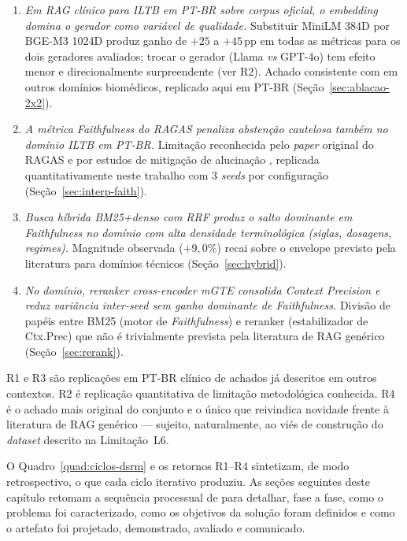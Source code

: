 \documentclass[
  12pt,
  oneside,
  a4paper,
  english,
  brazil
]{abntex2}
\begin{document}
\begin{enumerate}[label=\textbf{R\arabic*}, leftmargin=*]
  \item \emph{Em RAG clínico para ILTB em PT-BR sobre corpus oficial, o
        \emph{embedding} domina o gerador como variável de qualidade.}
        Substituir MiniLM 384D por BGE-M3 1024D produz ganho de $+25$
        a $+45$\,pp em todas as métricas para os dois geradores
        avaliados; trocar o gerador (Llama \emph{vs} GPT-4o) tem
        efeito menor e direcionalmente surpreendente (ver R2). Achado
        consistente com \citeauthor{ocaf2024} \cite{ocaf2024} em outros
        domínios biomédicos, replicado aqui em PT-BR
        (Seção~\ref{sec:ablacao-2x2}).
  \item \emph{A métrica \emph{Faithfulness} do RAGAS penaliza
        abstenção cautelosa também no domínio ILTB em PT-BR.}
        Limitação reconhecida pelo \emph{paper} original do RAGAS
        \cite{es2024} e por estudos de mitigação de alucinação
        \cite{huang2023halucination, zakka2024almanac, ocaf2024},
        replicada quantitativamente neste trabalho com 3 \emph{seeds}
        por configuração (Seção~\ref{sec:interp-faith}).
  \item \emph{Busca híbrida BM25+denso com RRF produz o salto dominante
        em \emph{Faithfulness} no domínio com alta densidade
        terminológica (siglas, dosagens, regimes).} Magnitude observada
        ($+9{,}0\%$) recai sobre o envelope previsto pela literatura
        \cite{wang2024bestpractices} para domínios técnicos
        (Seção~\ref{sec:hybrid}).
  \item \emph{No domínio, \emph{reranker} \emph{cross-encoder} mGTE
        consolida \emph{Context Precision} e reduz variância
        inter-\emph{seed} sem ganho dominante de \emph{Faithfulness}.}
        Divisão de papéis entre BM25 (motor de \emph{Faithfulness}) e
        reranker (estabilizador de Ctx.Prec) que não é trivialmente
        prevista pela literatura de RAG genérico
        (Seção~\ref{sec:rerank}).
\end{enumerate}

R1 e R3 são replicações em PT-BR clínico de achados já descritos em
outros contextos. R2 é replicação quantitativa de limitação
metodológica conhecida. R4 é o achado mais original do conjunto e o
único que reivindica novidade frente à literatura de RAG genérico ---
sujeito, naturalmente, ao viés de construção do \emph{dataset}
descrito na Limitação~L6.

O Quadro~\ref{quad:ciclos-dsrm} e os retornos R1--R4 sintetizam, de
modo retrospectivo, o que cada ciclo iterativo produziu. As seções
seguintes deste capítulo retomam a sequência processual de
\citeauthor{peffers2007} \cite{peffers2007} para detalhar, fase a
fase, como o problema foi caracterizado, como os objetivos da solução
foram definidos e como o artefato foi projetado, demonstrado, avaliado
e comunicado.
\end{document}
